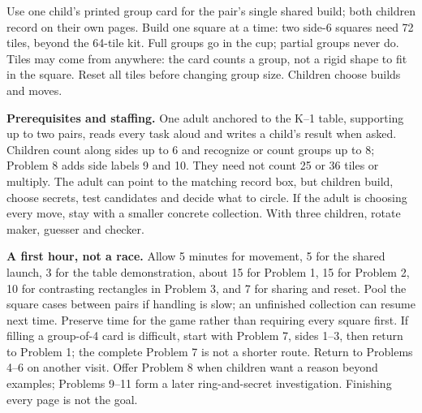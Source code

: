 \documentclass[11pt]{article}
\begin{document}
\begin{center}
\end{center}
Use one child's printed group card for the pair's single shared build; both children record on their own pages. Build one square at a time: two side-6 squares need 72 tiles, beyond the 64-tile kit. Full groups go in the cup; partial groups never do. Tiles may come from anywhere: the card counts a group, not a rigid shape to fit in the square. Reset all tiles before changing group size. Children choose builds and moves.

\textbf{Prerequisites and staffing.} One adult anchored to the K--1 table, supporting up to two pairs, reads every task aloud and writes a child's result when asked. Children count along sides up to 6 and recognize or count groups up to 8; Problem 8 adds side labels 9 and 10. They need not count 25 or 36 tiles or multiply. The adult can point to the matching record box, but children build, choose secrets, test candidates and decide what to circle. If the adult is choosing every move, stay with a smaller concrete collection. With three children, rotate maker, guesser and checker.

\textbf{A first hour, not a race.} Allow 5 minutes for movement, 5 for the shared launch, 3 for the table demonstration, about 15 for Problem 1, 15 for Problem 2, 10 for contrasting rectangles in Problem 3, and 7 for sharing and reset. Pool the square cases between pairs if handling is slow; an unfinished collection can resume next time. Preserve time for the game rather than requiring every square first. If filling a group-of-4 card is difficult, start with Problem 7, sides 1--3, then return to Problem 1; the complete Problem 7 is not a shorter route. Return to Problems 4--6 on another visit. Offer Problem 8 when children want a reason beyond examples; Problems 9--11 form a later ring-and-secret investigation. Finishing every page is not the goal.
\end{document}
